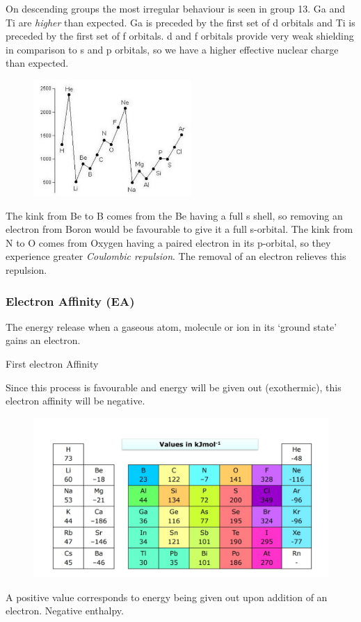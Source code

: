 \documentclass{article}
\newcommand{\NB}{{\large\lefthand}\quad}
\begin{document}
    On descending groups the most irregular behaviour is seen in group 13. Ga and Ti are \emph{higher} than
    expected. Ga is preceded by the first set of d orbitals and Ti is preceded by the first set of f orbitals.
    d and f orbitals provide very weak shielding in comparison to s and p orbitals, so we have a higher effective
    nuclear charge than expected.

    \begin{figure}[h]
        \centering
        \includegraphics[width=6cm]{group13.jpg}
    \end{figure}

    The kink from Be to B comes from the Be having a full s shell, so removing an electron from Boron would be 
    favourable to give it a full s-orbital. The kink from N to O comes from Oxygen having a paired electron in its
    p-orbital, so they experience greater \emph{Coulombic repulsion}. The removal of an electron relieves this
    repulsion.

    \subsubsection{Electron Affinity (EA)} The energy release when a gaseous atom,
    molecule or ion in its `ground state' gains an electron.
    \begin{center}
         \hspace{4ex} First electron Affinity
    \end{center}

    Since this process is favourable and energy will be given out (exothermic),
    this electron affinity will be negative.

    \begin{figure}[h]
        \centering
        \includegraphics[width=12cm]{ea.jpg}
    \end{figure}
    \NB A positive value corresponds to energy being given out upon addition of an electron. Negative enthalpy.
\end{document}
